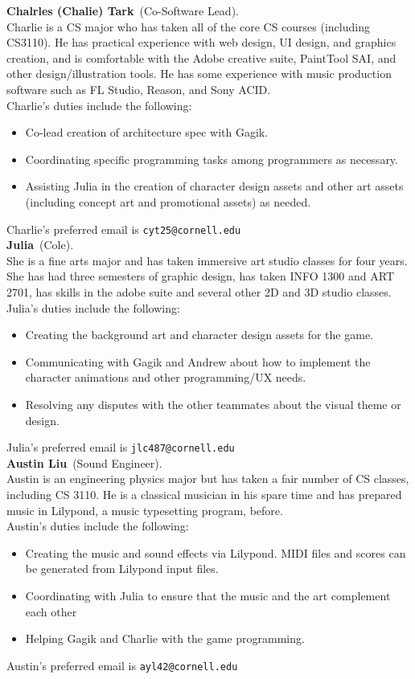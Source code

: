 \documentclass[letterpaper,11pt]{texMemo} %
\newcommand{\teammember}[2]{ \textbf{#1}\ (#2).\ }
\newenvironment{duties}[1]
               {
                 #1's duties include the following:
                 \begin{itemize}
               }
               {
                 \end{itemize}
               }
\newcommand{\preferredemail}[2]{#1's preferred email is \texttt{#2}\\}
\begin{document}
\teammember{Chalrles (Chalie) Tark}{Co-Software Lead}\\Charlie is a CS major who has taken all of the core CS courses (including CS3110).  He has practical experience with web design, UI design, and graphics creation, and is comfortable with the Adobe creative suite, PaintTool SAI, and other design/illustration tools.  He has some experience with music production software such as FL Studio, Reason, and Sony ACID.\\
\begin{duties}{Charlie}
\item{Co-lead creation of architecture spec with Gagik}.
\item{Coordinating specific programming tasks among programmers as necessary.}
\item{Assisting Julia in the creation of  character design assets and other art assets (including concept art and promotional assets) as needed.}
\end{duties}
\preferredemail{Charlie}{cyt25@cornell.edu}

\teammember{Julia}{Cole}\\She is a fine arts major and has taken immersive art studio classes for four years. She has had three semesters of graphic design, has taken INFO 1300 and ART 2701, has skills in the adobe suite and several other 2D and 3D studio classes.
\begin{duties}{Julia}
\item{Creating the background art and character design assets for the game.}
\item{Communicating with Gagik and Andrew about how to implement the character animations and other programming/UX needs.}
\item{Resolving any disputes with the other teammates about the visual theme or design.}
\end{duties}
\preferredemail{Julia}{jlc487@cornell.edu}

\teammember{Austin Liu}{Sound Engineer}\\Austin is an engineering physics major
but has taken a fair number of CS classes, including CS 3110. He is a classical
musician in his spare time and has prepared music in Lilypond, a music
typesetting program, before. \\
\begin{duties}{Austin}
\item Creating the music and sound effects via Lilypond.
  MIDI files and scores can be generated from Lilypond input files.
\item Coordinating with Julia to ensure that the music and the art complement
  each other
\item Helping Gagik and Charlie with the game programming.
\end{duties}
\preferredemail{Austin}{ayl42@cornell.edu}
\end{document}
